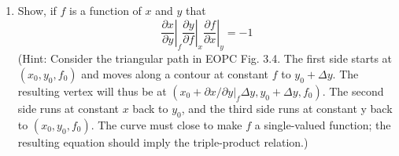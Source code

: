 \documentclass[10pt]{article}
\begin{document}
\begin{enumerate}
\begin{enumerate}
    \item \label{3.10b} Show, if $f$ is a function of $x$ and $y$ that 
    \begin{equation}
        \left.\frac{\partial x}{\partial y}\right|_f 
        \left.\frac{\partial y}{\partial f}\right|_x 
        \left.\frac{\partial f}{\partial x}\right|_y = -1
    \end{equation}
    (Hint:  Consider the triangular path in EOPC Fig. 3.4. The first side starts at $(x_0 , y_0 , f_0 )$ and moves along a contour at constant $f$ to $y_0+\Delta y$. The resulting vertex will thus be at $\left(x_0+\left. {\partial x/\partial y}\right|_f \Delta y, y_0+\Delta y, f_0\right)$. The second side runs at constant $x$ back to $y_0$, and the third side runs at constant y back to $(x_0 , y_0 , f_0 )$. The curve must close to make $f$ a single-valued function; the resulting equation should imply the triple-product relation.)
    

\end{enumerate}
\end{enumerate}
\end{document}
